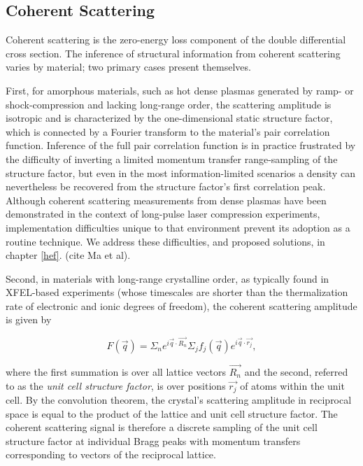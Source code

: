 \documentclass [11pt, proquest, article] {uwthesis}[2016/11/22]
\begin{document}
\label{coh}
\subsection{Coherent Scattering}
Coherent scattering is the zero-energy loss component of the double differential cross section.  The inference of structural information from coherent scattering varies by material; two primary cases present themselves.

%


First, for amorphous materials, such as hot dense plasmas generated by ramp- or shock-compression and lacking long-range order, the scattering amplitude is isotropic and is characterized by the one-dimensional static structure factor, which is connected by a Fourier transform to the material's pair correlation function. Inference of the full pair correlation function is in practice frustrated by the difficulty of inverting a limited momentum transfer range-sampling of the structure factor, but even in the most information-limited scenarios a density can nevertheless be recovered from the structure factor's first correlation peak. Although coherent scattering measurements from dense plasmas have been demonstrated in the context of long-pulse laser compression experiments, implementation difficulties unique to that environment prevent its adoption as a routine technique. We address these difficulties, and proposed solutions, in chapter \ref{hef}. (cite Ma et al).

Second, in materials with long-range crystalline order, as typically found in XFEL-based experiments (whose timescales are shorter than the thermalization rate of electronic and ionic degrees of freedom), the coherent scattering amplitude is given by

\begin{equation}
F(\vec{q}) = \Sigma_n e^{i \vec{q} \cdot \vec{R_n}} \Sigma_j f_j(\vec{q}) e^{i \vec{q} \cdot \vec{r_j}},
\end{equation}

where the first summation is over all lattice vectors $\vec{R_n}$ and the second, referred to as the \emph{unit cell structure factor}, is over positions $\vec{r_j}$ of atoms within the unit cell. By the convolution theorem, the crystal's scattering amplitude in reciprocal space is equal to the product of the lattice and unit cell structure factor. The coherent scattering signal is therefore a discrete sampling of the unit cell structure factor at individual Bragg peaks with momentum transfers corresponding to vectors of the reciprocal lattice.
\end{document}

